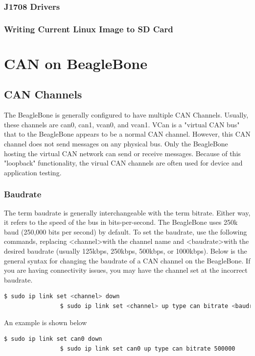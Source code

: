         \subsubsection{J1708 Drivers}
            
        \subsubsection{Writing Current Linux Image to SD Card}    
\section{CAN on BeagleBone}
    \subsection{CAN Channels}
        The BeagleBone is generally configured to have multiple CAN Channels. Usually, these channels are can0, can1, vcan0, and vcan1. VCan is a "virtual CAN bus" that to the BeagleBone appears to be a normal CAN channel. However, this CAN channel does not send messages on any physical bus. Only the BeagleBone hosting the virtual CAN network can send or receive messages. Because of this "loopback" functionality, the virual CAN channels are often used for device and application testing.
        \subsubsection{Baudrate}
            The term baudrate is generally interchangeable with the term bitrate. Either way, it refers to the speed of the bus in bits-per-second. The BeagleBone uses 250k baud (250,000 bits per second) by default. To set the baudrate, use the following commands, replacing \textless channel\textgreater with the channel name and \textless baudrate\textgreater  with the desired baudrate (usually 125kbps, 250kbps, 500kbps, or 1000kbps). Below is the general syntax for changing the baudrate of a CAN channel on the BeagleBone. If you are having connectivity issues, you may have the channel set at the incorrect baudrate.
            \begin{lstlisting}[language=bash, autogobble=true]
                $ sudo ip link set <channel> down
                $ sudo ip link set <channel> up type can bitrate <baudrate>
            \end{lstlisting}
            An example is shown below
            \begin{lstlisting}[language=bash, autogobble=true]
                $ sudo ip link set can0 down
                $ sudo ip link set can0 up type can bitrate 500000
            \end{lstlisting}
        
